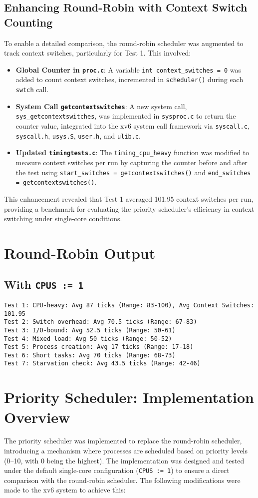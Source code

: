 \documentclass{article}
\begin{document}
\subsection{Enhancing Round-Robin with Context Switch Counting}
To enable a detailed comparison, the round-robin scheduler was augmented to track context switches, particularly for Test 1. This involved:
\begin{itemize}
    \item \textbf{Global Counter in \texttt{proc.c}}: A variable \texttt{int context\_switches = 0} was added to count context switches, incremented in \texttt{scheduler()} during each \texttt{swtch} call.
    \item \textbf{System Call \texttt{getcontextswitches}}: A new system call, \texttt{sys\_getcontextswitches}, was implemented in \texttt{sysproc.c} to return the counter value, integrated into the xv6 system call framework via \texttt{syscall.c}, \texttt{syscall.h}, \texttt{usys.S}, \texttt{user.h}, and \texttt{ulib.c}.
    \item \textbf{Updated \texttt{timingtests.c}}: The \texttt{timing\_cpu\_heavy} function was modified to measure context switches per run by capturing the counter before and after the test using \texttt{start\_switches = getcontextswitches()} and \texttt{end\_switches = getcontextswitches()}.
\end{itemize}
This enhancement revealed that Test 1 averaged 101.95 context switches per run, providing a benchmark for evaluating the priority scheduler’s efficiency in context switching under single-core conditions.

\section{Round-Robin Output}
\subsection{With \texttt{CPUS := 1}}
\begin{lstlisting}
Test 1: CPU-heavy: Avg 87 ticks (Range: 83-100), Avg Context Switches: 101.95
Test 2: Switch overhead: Avg 70.5 ticks (Range: 67-83)
Test 3: I/O-bound: Avg 52.5 ticks (Range: 50-61)
Test 4: Mixed load: Avg 50 ticks (Range: 50-52)
Test 5: Process creation: Avg 17 ticks (Range: 17-18)
Test 6: Short tasks: Avg 70 ticks (Range: 68-73)
Test 7: Starvation check: Avg 43.5 ticks (Range: 42-46)
\end{lstlisting}

\section{Priority Scheduler: Implementation Overview}
The priority scheduler was implemented to replace the round-robin scheduler, introducing a mechanism where processes are scheduled based on priority levels (0–10, with 0 being the highest). The implementation was designed and tested under the default single-core configuration (\texttt{CPUS := 1}) to ensure a direct comparison with the round-robin scheduler. The following modifications were made to the xv6 system to achieve this:
\end{document}

